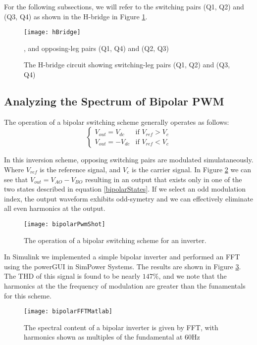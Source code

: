 For the following subsections, we will refer to the switching pairs (Q1, Q2) and (Q3, Q4) as shown in the H-bridge in Figure \ref{hBridge}.

\begin{figure}
\centering
\texttt{[image: hBridge]}
\caption{The H-bridge circuit showing switching-leg pairs (Q1, Q2) and (Q3, Q4)}, and opposing-leg pairs (Q1, Q4) and (Q2, Q3)
\label{hBridge}
\end{figure}


\subsection{Analyzing the Spectrum of Bipolar PWM}
The operation of a bipolar switching scheme generally operates as follows:
\begin{equation}
\begin{cases}
\label{bipolarStates}
V_{out} = V_{dc} &\mbox{if $V_{ref} > V_{c}$} \\
V_{out} = -V_{dc} &\mbox{if $V_{ref} < V_{c}$}
\end{cases}
\end{equation}

In this inversion scheme, opposing switching pairs are modulated simulataneously. 
Where $V_{ref}$ is the reference signal, and $V_c$ is the carrier signal. In Figure \ref{bipolarSwitchingOperation} we can see that $V_{out} = V_{AO}-V_{BO}$ resulting in an output that exists only in one of the two states described in equation \ref{bipolarStates}. If we select an odd modulation index, the output waveform exhibits odd-symetry and we can effectively eliminate all even harmonics at the output.

\begin{figure}
\centering
\texttt{[image: bipolarPwmShot]}
\caption{The operation of a bipolar switching scheme for an inverter.\cite{fourierAnalysis}} 
\label{bipolarSwitchingOperation}
\end{figure}

In Simulink we implemented a simple bipolar inverter and performed an FFT using the powerGUI in SimPower Systems. The results are shown in Figure \ref{bipolarFFTMatlab}. The THD of this signal is found to be nearly $147\%$, and we note that the harmonics at the the frequency of modulation are greater than the funamentals for this scheme.

\begin{figure}
\centering
\texttt{[image: bipolarFFTMatlab]}
\caption{The spectral content of a bipolar inverter is given by FFT, with harmonics shown as multiples of the fundamental at 60Hz}
\label{bipolarFFTMatlab}
\end{figure}

